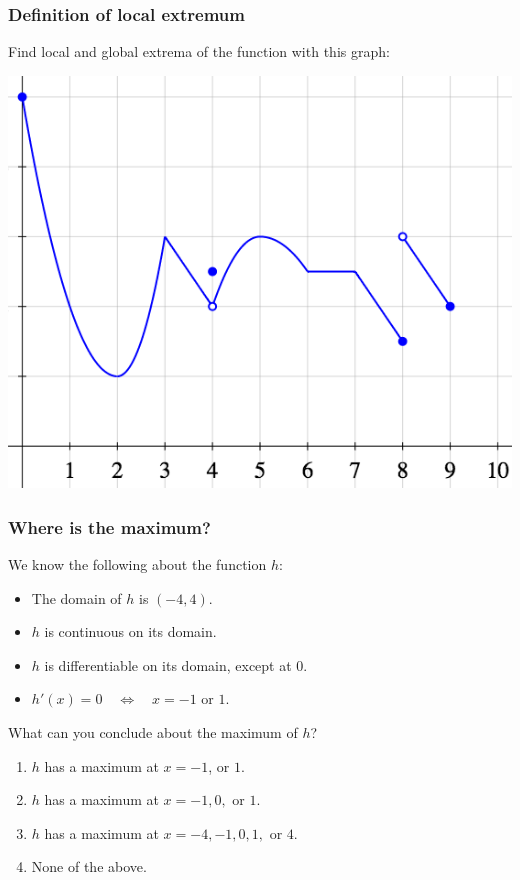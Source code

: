 \documentclass[14pt]{beamer}
\date{}
\title{}
\author{}
\begin{document}

	\begin{frame}
		\frametitle{Definition of local extremum}

		Find local and global extrema of the function with this graph:

		\begin{center}
			\includegraphics[scale=.42]{G13}
		\end{center}
	\end{frame}
	\begin{frame}[t]
		\frametitle{Where is the maximum?}

		We know the following about the function $h$:
		\begin{itemize}
			\item The domain of $h$ is $\displaystyle (-4,4)$.

			\item $h$ is continuous on its domain.

			\item $h$ is differentiable on its domain, except at $0$.

			\item $h'(x) = 0 \quad \iff \quad x=-1 \mbox{ or }1$.
		\end{itemize}

		\begin{block}{What can you conclude about the maximum of $h$?}
			\pause
			\begin{enumerate}
				\item $h$ has a maximum at $x=-1$, or $1$.

				\item $h$ has a maximum at $x=-1,0,$ or $1$.

				\item $h$ has a maximum at $x=-4, -1,0, 1,$ or $4$.

				\item None of the above.
			\end{enumerate}
		\end{block}
	\end{frame}
\end{document}
